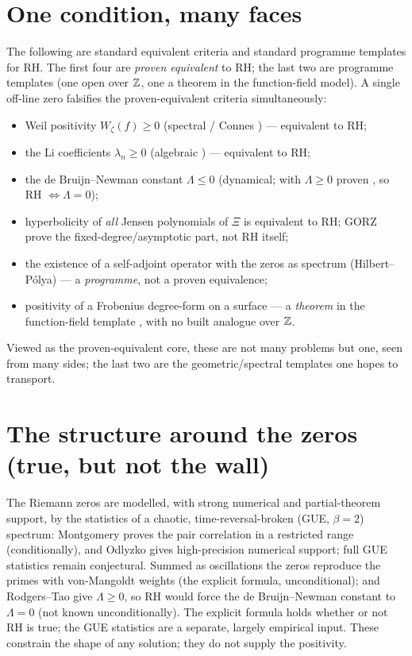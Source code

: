 \documentclass[11pt]{article}
\begin{document}
\section{One condition, many faces}
The following are standard equivalent criteria and standard programme templates for
RH. The first four are \emph{proven equivalent} to RH; the last two are programme
templates (one open over $\mathbb{Z}$, one a theorem in the function-field model). A single
off-line zero falsifies the proven-equivalent criteria simultaneously:
\begin{itemize}\itemsep1pt
  \item Weil positivity $W_\zeta(f)\ge 0$ (spectral / Connes \cite{Connes}) --- equivalent
        to RH;
  \item the Li coefficients $\lambda_n\ge 0$ (algebraic \cite{Li}) --- equivalent to
        RH;
  \item the de Bruijn--Newman constant $\Lambda\le 0$ (dynamical; with
        $\Lambda\ge 0$ proven \cite{RodgersTao}, so RH $\iff \Lambda=0$);
  \item hyperbolicity of \emph{all} Jensen polynomials of $\Xi$ is equivalent to RH;
        GORZ \cite{GORZ} prove the fixed-degree/asymptotic part, not RH itself;
  \item the existence of a self-adjoint operator with the zeros as spectrum
        (Hilbert--P\'olya) --- a \emph{programme}, not a proven equivalence;
  \item positivity of a Frobenius degree-form on a surface --- a \emph{theorem} in
        the function-field template \cite{Weil2,Deligne}, with no built analogue over
        $\mathbb{Z}$.
\end{itemize}
Viewed as the proven-equivalent core, these are not many problems but one, seen from
many sides; the last two are the geometric/spectral templates one hopes to transport.

\section{The structure around the zeros (true, but not the wall)}
The Riemann zeros are modelled, with strong numerical and partial-theorem support, by
the statistics of a chaotic, time-reversal-broken (GUE, $\beta=2$) spectrum: Montgomery
\cite{Montgomery} proves the pair correlation in a restricted range (conditionally),
and Odlyzko \cite{Odlyzko} gives high-precision numerical support; full GUE
statistics remain conjectural. Summed as oscillations the zeros reproduce the primes
with von-Mangoldt weights (the explicit formula, unconditional); and Rodgers--Tao give
$\Lambda\ge 0$, so RH would force the de Bruijn--Newman constant to $\Lambda=0$ (not
known unconditionally). The explicit formula holds whether or not RH is true; the GUE
statistics are a separate, largely empirical input. These constrain the shape of any
solution; they do not supply the positivity.
\end{document}
